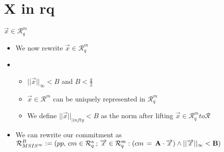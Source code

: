 \section{X in rq}
\begin{frame}{$\overrightarrow{x} \in \mathcal{R}^\mathit{m}_\mathit{q}$}
    \begin{itemize}
        \item We now rewrite $\overrightarrow{x} \in \mathcal{R}^m_q$
        \item  \begin{itemize}
                  \item $||\overrightarrow{x}||_{\infty} < B$ and $B < \frac{q}{2}$
                  \item $\overrightarrow{x} \in \mathcal{R}^m$ can be uniquely represented in $\mathcal{R}^m_q$
                  \item We define $||\overrightarrow{x}||_{|infty} < B$ as the norm after lifting $\overrightarrow{x} \in \mathcal{R}^m_q to \mathcal{R}$
              \end{itemize}
        \item We can rewrite our commitment as $\mathcal{R}^B_{MSIS^{\infty}} := {(pp, \, cm \in \mathcal{R}^{\kappa}_q\, ;\, \overrightarrow{x} \in \mathcal{R}^m_q : (cm\, =\, \bf{A}\cdot \overrightarrow{x} ) \land ||\overrightarrow{x}||_{\infty} < B  )}$
    \end{itemize}


\end{frame}